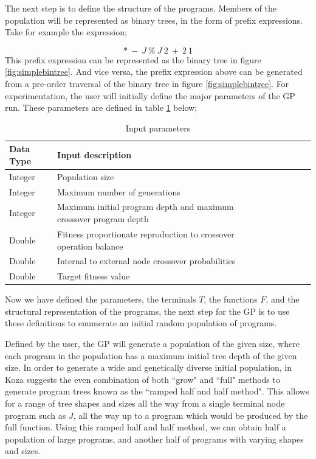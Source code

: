 \documentclass[a4paper,10.5pt]{article}
\begin{document}
\begin{text}The next step is to define the structure of the programs. Members of the population will be represented as binary trees, in the form of prefix expressions. Take for example the expression; \end{text}
\begin{equation*}*\ -\ J\ \%\ J\ 2\ +\ 2\ 1 \end{equation*} 
This prefix expression can be represented as the binary tree in figure \ref{fig:simplebintree}. And vice versa, the prefix expression above can be generated from a pre-order traversal of the binary tree in figure \ref{fig:simplebintree}. For experimentation, the user will initially define the major parameters of the GP run. These parameters are defined in table \ref{inputparam} below;

\begin{table}[H]
\centering
\caption{Input parameters}
\label{inputparam}
\begin{tabular}{l*{6}{l}r}
Data Type             & Input description\\
\hline
Integer & Population size\\
Integer & Maximum number of generations\\
Integer & Maximum initial program depth and maximum crossover program depth\\
Double & Fitness proportionate reproduction to crossover operation balance\\
Double & Internal to external node crossover probabilities\\
Double & Target fitness value\\
\end{tabular}
\end{table}

Now we have defined the parameters, the terminals $T$, the functions $F$, and the structural representation of the programs, the next step for the GP is to use these definitions to enumerate an initial random population of programs.

Defined by the user, the GP will generate a population of the given size, where each program in the population has a maximum initial tree depth of the given size. In order to generate a wide and genetically diverse initial population, in \cite[p.11-14]{introgp} Koza suggests the even combination of both ``grow" and ``full" methods to generate program trees known as the ``ramped half and half method". This allows for a range of tree shapes and sizes all the way from a single terminal node program such as $J$, all the way up to a program which would be produced by the full function. Using this ramped half and half method, we can obtain half a population of large programs, and another half of programs with varying shapes and sizes.
\end{document}
